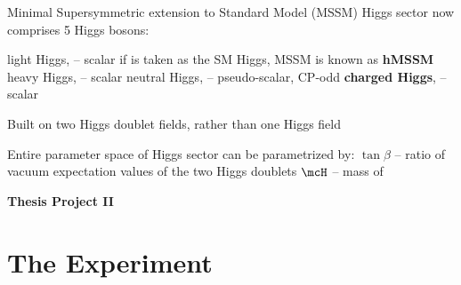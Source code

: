 \documentclass[10pt]{beamer}
\begin{document}
\begin{frame}{Minimal Supersymmetric extension to Standard Model (MSSM)}
Higgs sector now comprises 5 Higgs bosons:
\begin{outline}
\1 light Higgs, \hzero -- scalar
	\2 if \hzero is taken as the SM Higgs, MSSM is known as {\bf hMSSM}
\1 heavy Higgs, \Hzero -- scalar
\1 neutral Higgs, \Azero -- pseudo-scalar, CP-odd
\1 {\bf charged Higgs}, \Hpm -- scalar 
\end{outline}
\noindent\makebox[\linewidth]{\rule{\paperwidth}{0.4pt}}
Built on two Higgs doublet fields, rather than one Higgs field 
\begin{outline}
\1 Entire parameter space of Higgs sector can be parametrized by:
		\2 $\tan\beta$ -- ratio of vacuum expectation 
values of the two Higgs doublets
		\2 $\mcH$ -- mass of \Hpm
\end{outline}

\centering
{\bf \color{blue}\large Thesis Project II}\\
\end{frame}

\section{The Experiment}
\end{document}
